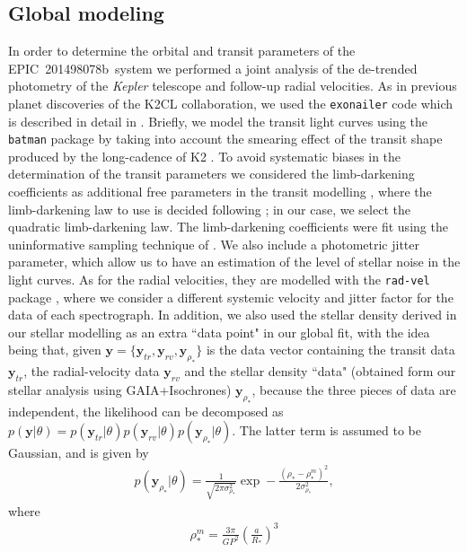 \documentclass[useAMS,usenatbib]{mnras}
\newcommand{\plname}{EPIC~201498078b}
\renewcommand\vec[1]{\ensuremath{\mathbf{#1}}}
\begin{document}
\subsection{Global modeling}
In order to determine the orbital and transit parameters of the \plname\ 
system we performed a joint analysis of the de-trended photometry of the
\textit{Kepler} telescope and follow-up radial velocities.
As in previous planet discoveries of the K2CL collaboration, we
used the \texttt{exonailer} code which is described in
detail in \citet{espinoza:2016:exo}. Briefly, we model the transit light
curves using the \texttt{batman} package \citep{kreidberg:2015} by taking
into account the smearing effect of the transit shape produced by the
long-cadence of K2 \citep{ kipping:2010}.
To avoid systematic biases in the determination of the transit parameters
we considered the limb-darkening coefficients as additional free parameters in the transit modelling \citep{EJ:2015}, where the limb-darkening law to use is decided following \citet{espinoza:2016:lds}; in our case, we select the quadratic limb-darkening law. The limb-darkening coefficients were fit using the 
uninformative sampling technique of \citet{Kipping:LDs}. We also include a 
photometric jitter parameter, which allow us to have an estimation of the level of stellar noise in the light curves. As for the radial velocities, they are modelled with
the \texttt{rad-vel} package \citep{fulton:2018}, where we consider a
different systemic velocity and jitter factor for the data of each spectrograph. 
In addition, we also used the stellar density derived in our stellar modelling as an extra ``data point" in our global fit, with the idea being that, given $\vec{y}=\{\vec{y}_{tr}, \vec{y}_{rv}, \vec{y}_{\rho_*}\}$ is the data vector containing the transit data $\vec{y}_{tr}$, the radial-velocity data $\vec{y}_{rv}$ and the 
stellar density ``data" (obtained form our stellar analysis using GAIA+Isochrones) $\vec{y}_{\rho_*}$, because the three pieces of data are independent, the likelihood can be decomposed as $p(\vec{y}|\theta ) = p(\vec{y}_{tr}|\theta )p(\vec{y}_{rv}|\theta )p(\vec{y}_{\rho_*}|\theta )$. The latter term is assumed to be Gaussian, and is 
given by
\begin{eqnarray*}
p(\vec{y}_{\rho_*}|\theta ) = \frac{1}{\sqrt{2\pi \sigma^2_{\rho_*}}} \exp -\frac{(\rho_* - \rho_*^m)^2}
{2\sigma_{\rho_*}^2} ,
\end{eqnarray*}
where 
\begin{eqnarray*}
   \rho^m_* = \frac{3\pi}{GP^2}\left(\frac{a}{R_*}\right)^3
\end{eqnarray*}
\end{document}
